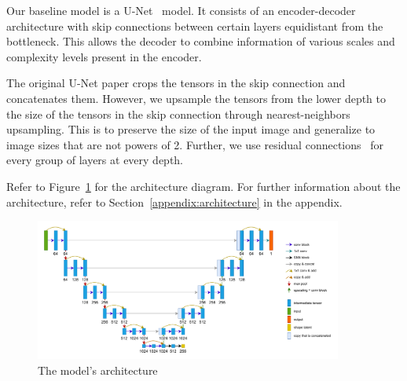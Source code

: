 Our baseline model is a U-Net~\cite{unet} model.
It consists of an encoder-decoder architecture with skip connections between certain layers equidistant from the bottleneck.
This allows the decoder to combine information of various scales and complexity levels present in the encoder.

The original U-Net paper crops the tensors in the skip connection and concatenates them.
However, we upsample the tensors from the lower depth to the size of the tensors in the skip connection through nearest-neighbors upsampling.
This is to preserve the size of the input image and generalize to image sizes that are not powers of 2.
Further, we use residual connections~\cite{resnet} for every group of layers at every depth.

Refer to Figure~\ref{fig:arch} for the architecture diagram.
For further information about the architecture, refer to Section~\ref{appendix:architecture} in the appendix.

\begin{figure}
    \centering
    \includegraphics[width=0.9\textwidth]{images/CIL-arch.pdf}
    \caption{The model's architecture}%
    \label{fig:arch}
\end{figure}
